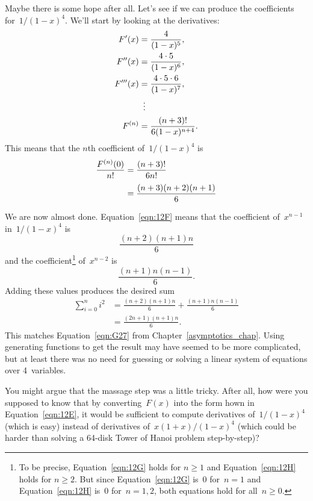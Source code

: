 Maybe there is some hope after all.  Let's see if we can produce the
coefficients for~$1/(1 - x)^4$.  We'll start by looking at the
derivatives:
\begin{align*}
F'(x)       &= \frac{4}{(1 - x)^5}, \\
F''(x)      &= \frac{4 \cdot 5}{(1 - x)^6}, \\
F'''(x)     &= \frac{4 \cdot 5 \cdot 6}{(1 - x)^7}, \\
            &\enskip \vdots \\
F^{(n)}     &= \frac{(n + 3)!}{ 6 (1 - x)^{n+4} }.
\end{align*}
This means that the $n$th coefficient of~$1/(1 - x)^4$ is
\begin{align}
\frac{F^{(n)}(0)}{n!}
    &= \frac{(n + 3)!}{6 n!} \notag\\[\smallskipamount]
    &= \frac{(n + 3) (n + 2) (n + 1)}{6} \label{eqn:12F}
\end{align}

We are now almost done.  Equation~\ref{eqn:12F} means that the
coefficient of~$x^{n - 1}$ in~$1/(1 - x)^4$ is
\begin{equation}\label{eqn:12G}
    \frac{(n + 2) (n + 1) n}{6}
\end{equation}
and the coefficient\footnote{To be precise, Equation~\ref{eqn:12G}
  holds for $n \ge 1$ and Equation~\ref{eqn:12H} holds for $n \ge 2$.
  But since Equation~\ref{eqn:12G} is~0 for~$n = 1$ and
  Equation~\ref{eqn:12H} is~0 for~$n = 1, 2$, both equations hold for
  all~$n \ge 0$.}  of~$x^{n - 2}$ is
\begin{equation}\label{eqn:12H}
    \frac{(n + 1) n (n - 1)}{6}.
\end{equation}
Adding these values produces the desired sum
\begin{align*}
\sum_{i = 0}^n i^2
    &= \frac{(n + 2) (n + 1) n}{6} + \frac{(n + 1) n (n - 1)}{6} \\
    &= \frac{ (2n + 1) (n + 1) n }{6}.
\end{align*}
This matches Equation~\ref{eqn:G27} from
Chapter~\ref{asymptotics_chap}.  Using generating functions to get the
result may have seemed to be more complicated, but at least there was
no need for guessing or solving a linear system of equations over
4~variables.

You might argue that the massage step was a little tricky.  After all,
how were you supposed to know that by converting~$F(x)$ into the form
hown in Equation~\ref{eqn:12E}, it would be sufficient to compute
derivatives of~$1/(1 - x)^4$ (which is easy) instead of derivatives
of~$x (1 + x) / (1 - x)^4$ (which could be harder than solving a
64-disk Tower of Hanoi problem step-by-step)?

